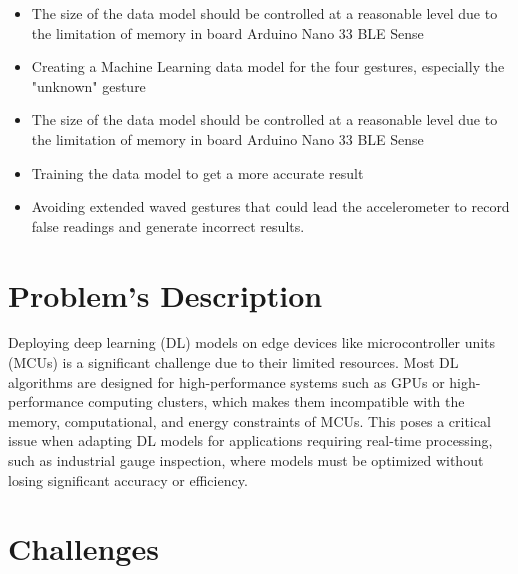 	\begin{itemize}	
		
		\item The size of the data model should be controlled at a reasonable level due to the limitation of memory in board Arduino Nano 33 BLE Sense \cite{shi:2016}
		\item Creating a Machine Learning data model for the four gestures, especially the "unknown" gesture
		\item The size of the data model should be controlled at a reasonable level due to the limitation of memory in board Arduino Nano 33 BLE Sense \cite{Ard:2021}
		\item Training the data model to get a more accurate result \cite{shi:2016}
		\item Avoiding extended waved gestures that could lead the accelerometer to record false readings and generate incorrect results.
		
	\end{itemize}


    \section{Problem's Description}

    Deploying deep learning (DL) models on edge devices like microcontroller units (MCUs) is a significant challenge due to their limited resources. Most DL algorithms are designed for high-performance systems such as GPUs or high-performance computing clusters, which makes them incompatible with the memory, computational, and energy constraints of MCUs. This poses a critical issue when adapting DL models for applications requiring real-time processing, such as industrial gauge inspection, where models must be optimized without losing significant accuracy or efficiency.
    
    \section{Challenges}
    
